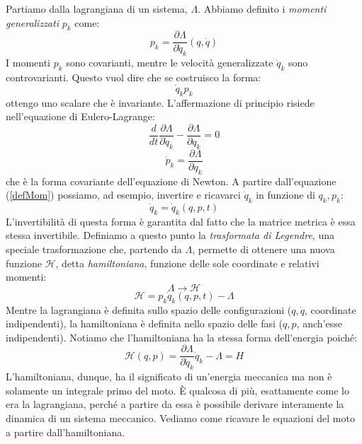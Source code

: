 \documentclass[a4paper,openany]{article}
\begin{document}
	Partiamo dalla lagrangiana di un sistema, $\Lambda$. Abbiamo definito i \textit{momenti generalizzati} $p_k$ come:
	\begin{equation}
		p_{k} = \dfrac{\partial \Lambda}{\partial \dot{q}_k}(q,\dot{q})
		\label{defMom}
	\end{equation}
	I momenti $p_k$ sono covarianti, mentre le velocità generalizzate $\dot{q}_k$ sono controvarianti. Questo vuol dire che se costruisco la forma:
	$$
	\dot{q}_k p_k
	$$
	ottengo uno scalare che è invariante. L'affermazione di principio risiede nell'equazione di Eulero-Lagrange:
	\begin{equation}\label{key}
		\dfrac{d}{dt} \dfrac{\partial \Lambda}{\partial \dot{q}_k} - \dfrac{\partial \Lambda}{\partial q_k} = 0
	\end{equation}
	$$
	\dot{p}_k = \dfrac{\partial \Lambda}{\partial q_k}
	$$
	che è la forma covariante dell'equazione di Newton. A partire dall'equazione (\ref{defMom}) possiamo, ad esempio, invertire e ricavarci $\dot{q}_k$ in funzione di $q_k,p_k$:
	$$
	\dot{q}_k = \dot{q}_k (q,p,t)
	$$
	L'invertibilità di questa forma è garantita dal fatto che la matrice metrica è essa stessa invertibile. Definiamo a questo punto la \textit{trasformata di Legendre}, una speciale trasformazione che, partendo da $\Lambda$, permette di ottenere una nuova funzione $\mathcal{H}$, detta \textit{hamiltoniana}, funzione delle sole coordinate e relativi momenti:
	\begin{equation}\label{key}
		\Lambda \rightarrow \mathcal{H}
	\end{equation}
	\begin{equation}\label{key}
		\mathcal{H} = p_{k}\dot{q}_k(q,p,t) - \Lambda 
	\end{equation}
	Mentre la lagrangiana è definita sullo spazio delle configurazioni ($q, \dot{q}$, coordinate indipendenti), la hamiltoniana è definita nello spazio delle fasi ($q,p$, anch'esse indipendenti). Notiamo che l'hamiltoniana ha la stessa forma dell'energia poiché:
	$$
	\mathcal{H}(q,p) = \dfrac{\partial \Lambda}{\partial \dot{q}_k}\dot{q}_k - \Lambda = H 
	$$
	L'hamiltoniana, dunque, ha il significato di un'energia meccanica ma non è solamente un integrale primo del moto. È qualcosa di più, esattamente come lo era la lagrangiana, perché a partire da essa è possibile derivare interamente la dinamica di un sistema meccanico. Vediamo come ricavare le equazioni del moto a partire dall'hamiltoniana.
\end{document}

